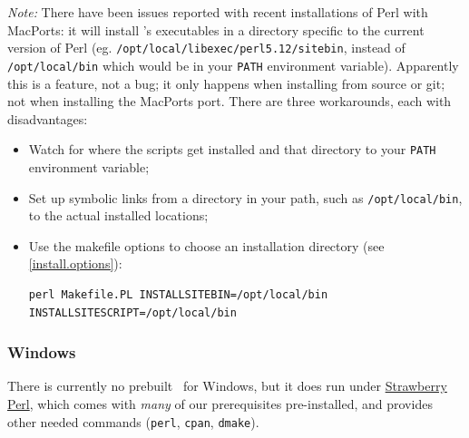 \documentclass{article}
\begin{document}
\emph{Note:} There have been issues reported with recent
installations of Perl with MacPorts:  it will install \LaTeXML's
executables in a directory specific to the current version of Perl
(eg. \texttt{/opt/local/libexec/perl5.12/sitebin},
instead of \texttt{/opt/local/bin} which would be in your \texttt{PATH} environment variable).
Apparently this is a feature, not a bug; it only happens when installing from source or git;
not when installing the MacPorts port.  There are three workarounds, each with disadvantages:
\begin{itemize}
\item Watch for where the scripts get installed and that directory to your \texttt{PATH}
  environment variable;
\item Set up symbolic links from a directory in your path, such as \texttt{/opt/local/bin},
  to the actual installed locations;
\item Use the makefile options to choose an installation directory (see \ref{install.options}):
\begin{lstlisting}[style=shell]
perl Makefile.PL INSTALLSITEBIN=/opt/local/bin INSTALLSITESCRIPT=/opt/local/bin
\end{lstlisting}
\end{itemize}

\subsubsection{Windows}\label{install.windows}
There is currently no prebuilt \LaTeXML\ for Windows,
but it does run under \href{http://strawberryperl.com}{Strawberry Perl},
which comes with \emph{many} of our prerequisites pre-installed,
and provides other needed commands (\texttt{perl}, \texttt{cpan}, \texttt{dmake}).
\end{document}
